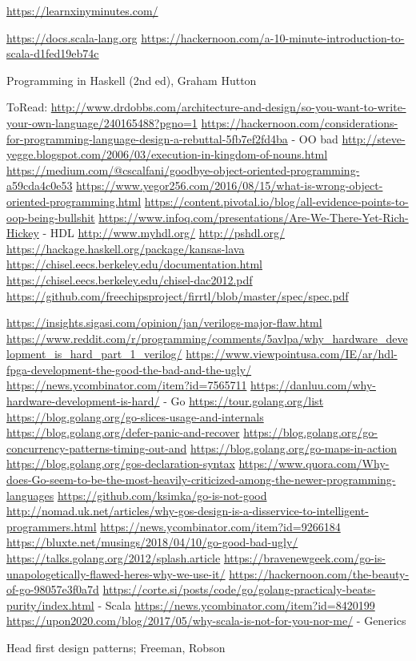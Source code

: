 \documentclass{report}
\begin{document}
\url{https://learnxinyminutes.com/}


\url{https://docs.scala-lang.org}
\url{https://hackernoon.com/a-10-minute-introduction-to-scala-d1fed19eb74c}

Programming in Haskell (2nd ed), Graham Hutton

ToRead:
\url{http://www.drdobbs.com/architecture-and-design/so-you-want-to-write-your-own-language/240165488?pgno=1}
\url{https://hackernoon.com/considerations-for-programming-language-design-a-rebuttal-5fb7ef2fd4ba}
- OO bad
\url{http://steve-yegge.blogspot.com/2006/03/execution-in-kingdom-of-nouns.html}
\url{https://medium.com/@cscalfani/goodbye-object-oriented-programming-a59cda4c0e53}
\url{https://www.yegor256.com/2016/08/15/what-is-wrong-object-oriented-programming.html}
\url{https://content.pivotal.io/blog/all-evidence-points-to-oop-being-bullshit}
\url{https://www.infoq.com/presentations/Are-We-There-Yet-Rich-Hickey}
- HDL
\url{http://www.myhdl.org/}
\url{http://pshdl.org/}
\url{https://hackage.haskell.org/package/kansas-lava}
\url{https://chisel.eecs.berkeley.edu/documentation.html}
\url{https://chisel.eecs.berkeley.edu/chisel-dac2012.pdf}
\url{https://github.com/freechipsproject/firrtl/blob/master/spec/spec.pdf}

\url{https://insights.sigasi.com/opinion/jan/verilogs-major-flaw.html}
\url{https://www.reddit.com/r/programming/comments/5avlpa/why_hardware_development_is_hard_part_1_verilog/}
\url{https://www.viewpointusa.com/IE/ar/hdl-fpga-development-the-good-the-bad-and-the-ugly/}
\url{https://news.ycombinator.com/item?id=7565711}
\url{https://danluu.com/why-hardware-development-is-hard/}
- Go
\url{https://tour.golang.org/list}
\url{https://blog.golang.org/go-slices-usage-and-internals}
\url{https://blog.golang.org/defer-panic-and-recover}
\url{https://blog.golang.org/go-concurrency-patterns-timing-out-and}
\url{https://blog.golang.org/go-maps-in-action}
\url{https://blog.golang.org/gos-declaration-syntax}
\url{https://www.quora.com/Why-does-Go-seem-to-be-the-most-heavily-criticized-among-the-newer-programming-languages}
\url{https://github.com/ksimka/go-is-not-good}
\url{http://nomad.uk.net/articles/why-gos-design-is-a-disservice-to-intelligent-programmers.html}
\url{https://news.ycombinator.com/item?id=9266184}
\url{https://bluxte.net/musings/2018/04/10/go-good-bad-ugly/}
\url{https://talks.golang.org/2012/splash.article}
\url{https://bravenewgeek.com/go-is-unapologetically-flawed-heres-why-we-use-it/}
\url{https://hackernoon.com/the-beauty-of-go-98057e3f0a7d}
\url{https://corte.si/posts/code/go/golang-practicaly-beats-purity/index.html}
- Scala
\url{https://news.ycombinator.com/item?id=8420199}
\url{https://upon2020.com/blog/2017/05/why-scala-is-not-for-you-nor-me/}
- Generics


Head first design patterns; Freeman, Robson
\end{document}
